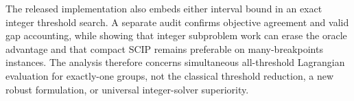\documentclass[11pt]{article}
\begin{document}
The released implementation also embeds either interval bound in an exact integer threshold search.  A separate audit confirms objective agreement and valid gap accounting, while showing that integer subproblem work can erase the oracle advantage and that compact SCIP remains preferable on many-breakpoints instances.  The analysis therefore concerns simultaneous all-threshold Lagrangian evaluation for exactly-one groups, not the classical threshold reduction, a new robust formulation, or universal integer-solver superiority.
\end{document}
